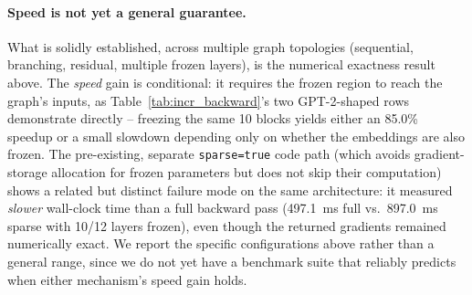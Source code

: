 \documentclass{article}
\begin{document}
\paragraph{Speed is not yet a general guarantee.} What is solidly established, across multiple graph topologies (sequential, branching, residual, multiple frozen layers), is the numerical exactness result above. The \emph{speed} gain is conditional: it requires the frozen region to reach the graph's inputs, as Table~\ref{tab:incr_backward}'s two GPT-2-shaped rows demonstrate directly -- freezing the same 10 blocks yields either an 85.0\% speedup or a small slowdown depending only on whether the embeddings are also frozen. The pre-existing, separate \texttt{sparse=true} code path (which avoids gradient-storage allocation for frozen parameters but does not skip their computation) shows a related but distinct failure mode on the same architecture: it measured \emph{slower} wall-clock time than a full backward pass (497.1~ms full vs.\ 897.0~ms sparse with 10/12 layers frozen), even though the returned gradients remained numerically exact. We report the specific configurations above rather than a general range, since we do not yet have a benchmark suite that reliably predicts when either mechanism's speed gain holds.
\end{document}
